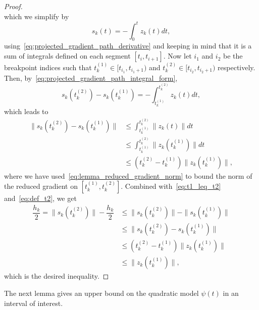 \documentclass{article}
\numberwithin{equation}{section}
\theoremstyle{plain}
\begin{document}
\begin{proof}
\begin{equation*}
		\end{equation*} 
		which we simplify by
		\begin{equation}\label{eq:projected_gradient_path_integral_form}
			s_k(t) = -\int_{0}^{t} z_k(t)dt,
		\end{equation}
		using~\eqref{eq:projected_gradient_path_derivative} and keeping in mind that it is a sum of integrals defined on each segment $[t_i,t_{i+1}]$. 
		Now let $i_1$ and $i_2$ be the breakpoint indices such that $t_k^{(1)} \in [t_{i_1},t_{i_1+1})$ and $t_k^{(2)} \in [t_{i_2},t_{i_2+1})$ respectively. Then, by~\eqref{eq:projected_gradient_path_integral_form},
		\begin{equation*}
			s_k(t_k^{(2)}) - s_k(t_k^{(1)}) = -\int_{t_k^{(1)}}^{t_k^{(2)}} z_k(t)dt, 
		\end{equation*}
		which leads to
		\begin{equation*}
			\begin{split}
				\|s_k(t_k^{(2)}) - s_k(t_k^{(1)})\| & \le \int_{t_k^{(1)}}^{t_k^{(2)}} \|z_k(t)\|dt \\
				& \le \int_{t_k^{(1)}}^{t_k^{(2)}} \|z_k(t_k^{(1)})\|dt \\
				& \le (t_k^{(2)}-t_k^{(1)}) \|z_k(t_k^{(1)})\|,
			\end{split}
		\end{equation*}
		where we have used~\eqref{eq:lemma_reduced_gradient_norm} to bound the norm of the reduced gradient on $[t_k^{(1)},t_k^{(2)}]$.
		Combined with~\eqref{eq:t1_leq_t2} and~\eqref{eq:def_t2}, we get
		\begin{equation*}
			\begin{split}
				\dfrac{h_k}{2} = \|s_k(t_k^{(2)})\| - \dfrac{h_k}{2} &\le  \|s_k(t_k^{(2)})\| - \|s_k(t_k^{(1)})\| \\ 
				& \le \|s_k(t_k^{(2)}) - s_k(t_k^{(1)})\| \\
				& \le 	(t_k^{(2)}-t_k^{(1)}) \|z_k(t_k^{(1)})\| \\
				& \le  \|z_k(t_k^{(1)})\|,
			\end{split}
		\end{equation*}
		which is the desired inequality.
	\end{proof}
	
	The next lemma gives an upper bound on the quadratic model $\psi(t)$ in an interval of interest.
	
\end{document}
